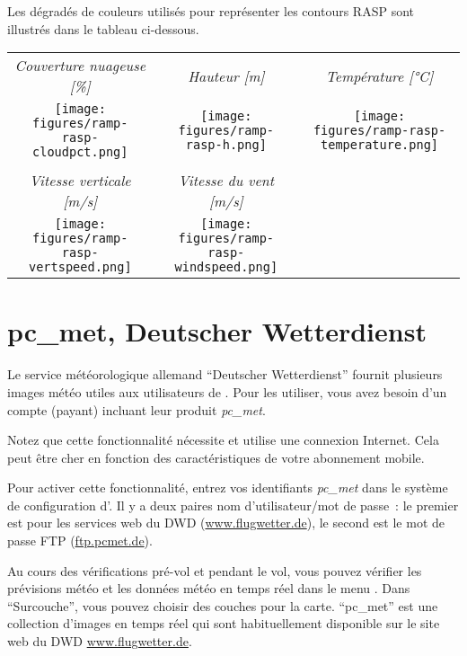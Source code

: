 \begin{maxipage}
Les dégradés de couleurs utilisés pour représenter les contours RASP sont illustrés dans le tableau ci-dessous.

\begin{longtable}{c c c}
\emph{Couverture nuageuse [\%]} & \emph{Hauteur [m]} & \emph{Température [°C]} \\
\texttt{[image: figures/ramp-rasp-cloudpct.png]} &
\texttt{[image: figures/ramp-rasp-h.png]} &
\texttt{[image: figures/ramp-rasp-temperature.png]} \\
\\
\emph{Vitesse verticale [m/s]} & \emph{Vitesse du vent [m/s]} & \\
\texttt{[image: figures/ramp-rasp-vertspeed.png]} &
\texttt{[image: figures/ramp-rasp-windspeed.png]} & \\

\end{longtable}
\end{maxipage}

\section{pc\_met, Deutscher Wetterdienst}\label{sec:pcmet}

Le service météorologique allemand ``Deutscher Wetterdienst'' fournit plusieurs images météo utiles aux utilisateurs de \xc.
Pour les utiliser, vous avez besoin d'un compte (payant) incluant leur produit \emph{pc\_met}.

Notez que cette fonctionnalité nécessite et utilise une connexion Internet.
Cela peut être cher en fonction des caractéristiques de votre abonnement mobile.

Pour activer cette fonctionnalité, entrez vos identifiants \emph{pc\_met} dans le système de configuration d'\xc.
Il y a deux paires nom d'utilisateur/mot de passe~: le premier est pour les services web du DWD (\url{www.flugwetter.de}), le second est le mot de passe FTP (\url{ftp.pcmet.de}).

Au cours des vérifications pré-vol et pendant le vol, vous pouvez vérifier les prévisions météo et les données météo en temps réel dans le menu  .
Dans ``Surcouche'', vous pouvez choisir des couches pour la carte.
``pc\_met'' est une collection d'images en temps réel qui sont habituellement disponible sur le site web du DWD \url{www.flugwetter.de}.
